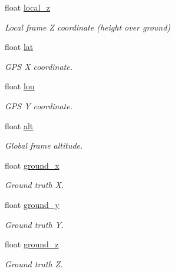 \begin{DoxyCompactItemize}
float \hyperlink{struct____mavlink__image__triggered__t_a781ed148c148052c863ea2007174a181}{local\+\_\+z}
\begin{DoxyCompactList}\small\item\em Local frame Z coordinate (height over ground) \end{DoxyCompactList}\item 
float \hyperlink{struct____mavlink__image__triggered__t_a926411af0a73f2ca64ed8d2a330f30d1}{lat}
\begin{DoxyCompactList}\small\item\em G\+P\+S X coordinate. \end{DoxyCompactList}\item 
float \hyperlink{struct____mavlink__image__triggered__t_a52e7b9a9367c72d7ce75dd4cd8e2163a}{lon}
\begin{DoxyCompactList}\small\item\em G\+P\+S Y coordinate. \end{DoxyCompactList}\item 
float \hyperlink{struct____mavlink__image__triggered__t_a8a3d3a4523082e1a47d8ac34e2db7572}{alt}
\begin{DoxyCompactList}\small\item\em Global frame altitude. \end{DoxyCompactList}\item 
float \hyperlink{struct____mavlink__image__triggered__t_a2a4b5d026c178f8a7abb531368f850a9}{ground\+\_\+x}
\begin{DoxyCompactList}\small\item\em Ground truth X. \end{DoxyCompactList}\item 
float \hyperlink{struct____mavlink__image__triggered__t_a30e2fc24992a8510a84014439400f985}{ground\+\_\+y}
\begin{DoxyCompactList}\small\item\em Ground truth Y. \end{DoxyCompactList}\item 
float \hyperlink{struct____mavlink__image__triggered__t_a19676d759a81600df8df9a77f68c2563}{ground\+\_\+z}
\begin{DoxyCompactList}\small\item\em Ground truth Z. \end{DoxyCompactList}\end{DoxyCompactItemize}


